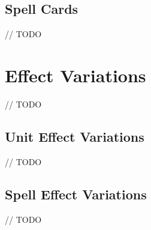 \subsection{Spell Cards}
// TODO








\section{Effect Variations}
// TODO

\subsection{Unit Effect Variations}
// TODO

\subsection{Spell Effect Variations}
// TODO



